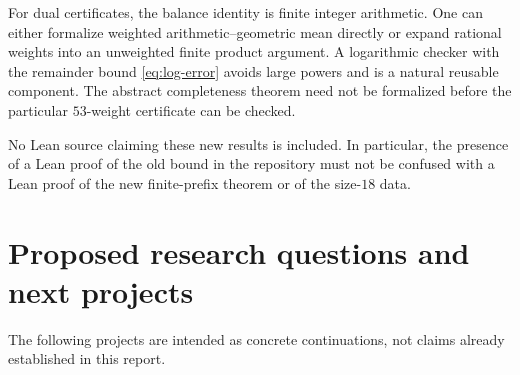 \documentclass[11pt,a4paper]{article}
\theoremstyle{definition}
\theoremstyle{remark}
\begin{document}
For dual certificates, the balance identity is finite integer arithmetic.
One can either formalize weighted arithmetic--geometric mean directly or
expand rational weights into an unweighted finite product argument. A
logarithmic checker with the remainder bound \eqref{eq:log-error} avoids
large powers and is a natural reusable component. The abstract completeness
theorem need not be formalized before the particular $53$-weight certificate
can be checked.

No Lean source claiming these new results is included. In particular, the
presence of a Lean proof of the old bound in the repository must not be
confused with a Lean proof of the new finite-prefix theorem or of the
size-$18$ data.

\section{Proposed research questions and next projects}
\label{sec:questions}

The following projects are intended as concrete continuations, not claims
already established in this report.
\end{document}
